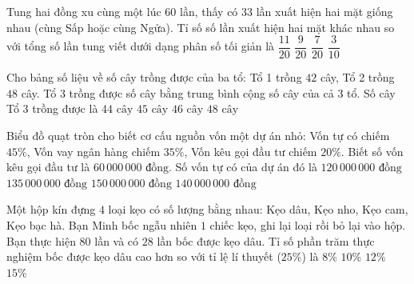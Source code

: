\begin{ex} %
Tung hai đồng xu cùng một lúc $60$ lần, thấy có $33$ lần xuất hiện hai mặt giống nhau (cùng Sấp hoặc cùng Ngửa). Tỉ số số lần xuất hiện hai mặt khác nhau so với tổng số lần tung viết dưới dạng phân số tối giản là
\choice
{$\dfrac{11}{20}$}
{\True $\dfrac{9}{20}$}
{$\dfrac{7}{20}$}
{$\dfrac{3}{10}$}
\end{ex}

\begin{ex} %
Cho bảng số liệu về số cây trồng được của ba tổ: Tổ 1 trồng $42$ cây, Tổ 2 trồng $48$ cây. Tổ 3 trồng được số cây bằng trung bình cộng số cây của cả $3$ tổ. Số cây Tổ 3 trồng được là
\choice
{$44\text{ cây}$}
{\True $45\text{ cây}$}
{$46\text{ cây}$}
{$48\text{ cây}$}
\end{ex}

\begin{ex} %
Biểu đồ quạt tròn cho biết cơ cấu nguồn vốn một dự án nhỏ: Vốn tự có chiếm $45\%$, Vốn vay ngân hàng chiếm $35\%$, Vốn kêu gọi đầu tư chiếm $20\%$. Biết số vốn kêu gọi đầu tư là $60\,000\,000\text{ đồng}$. Số vốn tự có của dự án đó là
\choice
{$120\,000\,000\text{ đồng}$}
{\True $135\,000\,000\text{ đồng}$}
{$150\,000\,000\text{ đồng}$}
{$140\,000\,000\text{ đồng}$}
\end{ex}

\begin{ex} %
Một hộp kín đựng $4$ loại kẹo có số lượng bằng nhau: Kẹo dâu, Kẹo nho, Kẹo cam, Kẹo bạc hà. Bạn Minh bốc ngẫu nhiên $1$ chiếc kẹo, ghi lại loại rồi bỏ lại vào hộp. Bạn thực hiện $80$ lần và có $28$ lần bốc được kẹo dâu. Tỉ số phần trăm thực nghiệm bốc được kẹo dâu cao hơn so với tỉ lệ lí thuyết ($25\%$) là
\choice
{$8\%$}
{\True $10\%$}
{$12\%$}
{$15\%$}
\end{ex}

